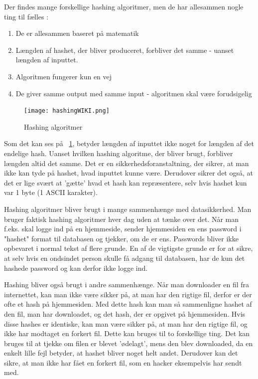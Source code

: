 \documentclass[12pt]{article}
\begin{document}
Der findes mange forskellige hashing algoritmer, men de har allesammen nogle ting til fælles \cite{Okta}:
\begin{enumerate}
\item De er allesammen baseret på matematik 
\item Længden af hashet, der bliver produceret, forbliver det samme - uanset længden af inputtet.
\item Algoritmen fungerer kun en vej 
\item De giver samme output med samme input - algoritmen skal være forudsigelig
\end{enumerate}


\begin{figure}[h]
\texttt{[image: hashingWIKI.png]} 
\centering
\caption{Hashing algoritmer \cite{wiki:hash}}
\label{fig:hashing-algo-example}
\end{figure}

Som det kan ses på \figurename{~\ref{fig:hashing-algo-example}}, betyder længden af inputtet ikke noget for længden af det endelige hash. Uanset hvilken hashing algoritme, der bliver brugt, forbliver længden altid det samme. Det er en sikkerhedsforanstaltning, der sikrer, at man ikke kan tyde på hashet, hvad inputtet kunne være. Derudover sikrer det også, at det er lige svært at 'gætte' hvad et hash kan repræsentere, selv hvis hashet kun var 1 byte (1 ASCII karakter). 


Hashing algoritmer bliver brugt i mange sammenhænge med datasikkerhed.
Man bruger faktisk hashing algoritmer hver dag uden at tænke over det.
Når man f.eks. skal logge ind på en hjemmeside, sender hjemmesiden en ens password i "hashet" format til databasen og tjekker, om de er ens.
Passwords bliver ikke opbevaret i normal tekst af flere grunde. 
En af de vigtigste grunde er for at sikre, at selv hvis en ondsindet person skulle få adgang til databasen, har de kun det hashede password og kan derfor ikke logge ind. 
\cite{Okta} 


Hashing bliver også brugt i andre sammenhænge. 
Når man downloader en fil fra internettet, kan man ikke være sikker på, at man har den rigtige fil, derfor er der ofte et hash på hjemmesiden. Med dette hash kan man så sammenligne hashet af den fil, man har downloadet, og det hash, der er opgivet på hjemmesiden. 
Hvis disse hashes er identiske, kan man være sikker på, at man har den rigtige fil, og ikke har modtaget en forkert fil. Dette kan bruges til to forskellige ting. Det kan bruges til at tjekke om filen er blevet 'ødelagt', mens den blev downloaded, da en enkelt lille fejl betyder, at hashet bliver noget helt andet. Derudover kan det sikre, at man ikke har fået en forkert fil, som en hacker eksempelvis har sendt med. \cite{techiedip_what_2012}
\end{document}
